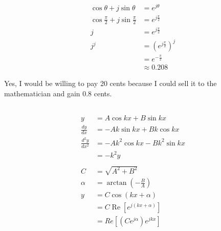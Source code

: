 \documentclass{article}
\renewcommand{\Re}{\operatorname{Re}}
\begin{document}
\setcounter{subsection}{8}
\subsection{}

\begin{align*}
  \cos \theta + j \sin \theta               & = e^{j \theta}            \\
  \cos \frac{\pi}{2} + j \sin \frac{\pi}{2} & = e^{j \frac{\pi}{2}}     \\
  j                                         & = e^{j \frac{\pi}{2}}     \\
  j^j                                       & = (e^{j \frac{\pi}{2}})^j \\
                                            & = e^{-\frac{\pi}{2}}      \\
                                            & \approx 0.208
\end{align*}

Yes, I would be willing to pay 20 cents because I could sell it to the mathematician and gain 0.8 cents.

\subsection{}

\begin{align*}
  y                   & = A \cos k x + B \sin k x             \\
  \frac{d y}{d x}     & = -A k \sin k x + B k \cos k x        \\
  \frac{d^2 y}{d x^2} & = -A k^2 \cos k x - B k^2 \sin k x    \\
                      & = -k^2 y                              \\ \\
  C                   & = \sqrt{A^2 + B^2}                    \\
  \alpha              & = \arctan \left( -\frac{B}{A} \right) \\
  y                   & = C \cos (k x + \alpha)               \\
                      & = C \Re [e^{j (k x + \alpha)}]        \\
                      & = Re[(C e^{j \alpha}) e^{j k x}]
\end{align*}

\subsection{}
\end{document}
